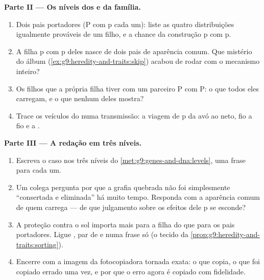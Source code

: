 \begin{problem}
\medskip\noindent\textbf{Parte II --- Os níveis dos
 e da família.}
\begin{enumerate}[resume]
  \item Dois pais portadores (P com p cada um): liste as
        quatro distribuições igualmente prováveis de um
        filho, e a chance da construção p com p.
  \item A filha p com p deles nasce de dois pais de
        aparência comum. Que mistério do álbum
        (\cref{ex:g9:heredity-and-traits:skip}) acabou de
        rodar com o mecanismo inteiro?
  \item Os filhos que a própria filha tiver com um parceiro
        P com P: o que todos eles carregam, e o que nenhum
        deles mostra?
  \item Trace os veículos do  numa transmissão: a
        viagem de p da avó ao neto, fio a fio e  a
        .
\end{enumerate}

\medskip\noindent\textbf{Parte III --- A redação em três
níveis.}
\begin{enumerate}[resume]
  \item Escreva o caso nos três níveis do
        \cref{met:g9:genes-and-dna:levels}, uma frase para
        cada um.
  \item Um colega pergunta por que a grafia quebrada não foi
        simplesmente ``consertada e eliminada'' há muito
        tempo. Responda com a aparência comum de quem
        carrega --- de que julgamento sobre os efeitos dele
        p se esconde?
  \item A proteção contra o sol importa mais para a filha do
        que para os pais portadores. Ligue ,
        par de  e  numa frase só (o tecido da
        \cref{prop:g9:heredity-and-traits:sorting}).
  \item Encerre com a imagem da fotocopiadora tornada exata:
        o que copia, o que foi copiado errado uma vez, e por
        que o erro agora é copiado com fidelidade.
\end{enumerate}
\end{problem}
